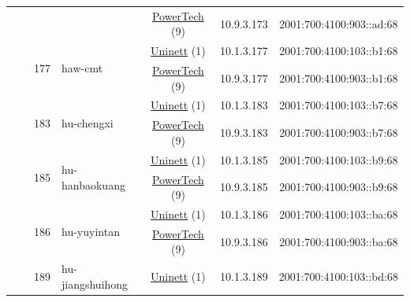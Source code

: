 \begin{small}
\begin{center}
\begin{longtable}{|c|c|c|c|c|c|c|c|}
  &  &  &  & \multicolumn{2}{|c|}{\tiny{\href{http://www.powertech.no}{PowerTech} (9)}} & \tiny{10.9.3.173} & \tiny{2001:700:4100:903::ad:68} \\* \cline{3-3}\cline{4-4}\cline{5-5}\cline{6-6}\cline{7-7}\cline{8-8}
  &  & \multirow{2}{*}{\tiny{177}} & \multicolumn{1}{|l|}{\multirow{2}{*}{\tiny{haw-cmt}}} & \multicolumn{2}{|c|}{\tiny{\href{https://www.uninett.no}{Uninett} (1)}} & \tiny{10.1.3.177} & \tiny{2001:700:4100:103::b1:68} \\* \cline{5-5}\cline{6-6}\cline{7-7}\cline{8-8}
  &  &  &  & \multicolumn{2}{|c|}{\tiny{\href{http://www.powertech.no}{PowerTech} (9)}} & \tiny{10.9.3.177} & \tiny{2001:700:4100:903::b1:68} \\* \cline{3-3}\cline{4-4}\cline{5-5}\cline{6-6}\cline{7-7}\cline{8-8}
  &  & \multirow{2}{*}{\tiny{183}} & \multicolumn{1}{|l|}{\multirow{2}{*}{\tiny{hu-chengxi}}} & \multicolumn{2}{|c|}{\tiny{\href{https://www.uninett.no}{Uninett} (1)}} & \tiny{10.1.3.183} & \tiny{2001:700:4100:103::b7:68} \\* \cline{5-5}\cline{6-6}\cline{7-7}\cline{8-8}
  &  &  &  & \multicolumn{2}{|c|}{\tiny{\href{http://www.powertech.no}{PowerTech} (9)}} & \tiny{10.9.3.183} & \tiny{2001:700:4100:903::b7:68} \\* \cline{3-3}\cline{4-4}\cline{5-5}\cline{6-6}\cline{7-7}\cline{8-8}
  &  & \multirow{2}{*}{\tiny{185}} & \multicolumn{1}{|l|}{\multirow{2}{*}{\tiny{hu-hanbaokuang}}} & \multicolumn{2}{|c|}{\tiny{\href{https://www.uninett.no}{Uninett} (1)}} & \tiny{10.1.3.185} & \tiny{2001:700:4100:103::b9:68} \\* \cline{5-5}\cline{6-6}\cline{7-7}\cline{8-8}
  &  &  &  & \multicolumn{2}{|c|}{\tiny{\href{http://www.powertech.no}{PowerTech} (9)}} & \tiny{10.9.3.185} & \tiny{2001:700:4100:903::b9:68} \\* \cline{3-3}\cline{4-4}\cline{5-5}\cline{6-6}\cline{7-7}\cline{8-8}
  &  & \multirow{2}{*}{\tiny{186}} & \multicolumn{1}{|l|}{\multirow{2}{*}{\tiny{hu-yuyintan}}} & \multicolumn{2}{|c|}{\tiny{\href{https://www.uninett.no}{Uninett} (1)}} & \tiny{10.1.3.186} & \tiny{2001:700:4100:103::ba:68} \\* \cline{5-5}\cline{6-6}\cline{7-7}\cline{8-8}
  &  &  &  & \multicolumn{2}{|c|}{\tiny{\href{http://www.powertech.no}{PowerTech} (9)}} & \tiny{10.9.3.186} & \tiny{2001:700:4100:903::ba:68} \\* \cline{3-3}\cline{4-4}\cline{5-5}\cline{6-6}\cline{7-7}\cline{8-8}
  &  & \multirow{2}{*}{\tiny{189}} & \multicolumn{1}{|l|}{\multirow{2}{*}{\tiny{hu-jiangshuihong}}} & \multicolumn{2}{|c|}{\tiny{\href{https://www.uninett.no}{Uninett} (1)}} & \tiny{10.1.3.189} & \tiny{2001:700:4100:103::bd:68} \\* \cline{5-5}\cline{6-6}\cline{7-7}\cline{8-8}

\end{longtable}
\end{center}
\end{small}
